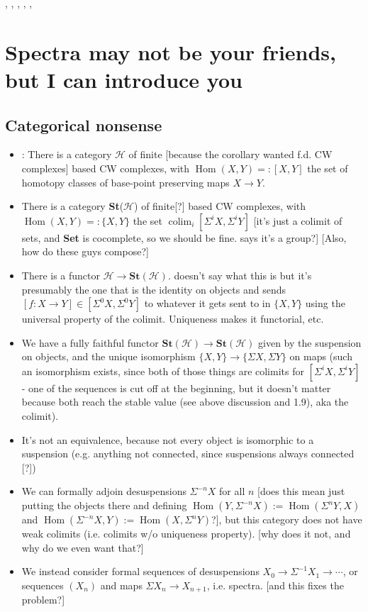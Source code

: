 \documentclass{MetricNotes2023}
\DeclareMathOperator{\colim}{colim}
\DeclareMathOperator{\Hom}{Hom}
\begin{document}
\autocite{stable_homotopy}, \autocite{cobordism}, 
\autocite{ass}, \autocite{spectra}, \autocite{hatcher}, \autocite{foundations}

\section{Spectra may not be your friends, but I can introduce you}

\subsection{Categorical nonsense}

\begin{itemize}
\item \autocite{ass}: There is a category \(\mathcal{H}\) of finite [because the corollary wanted f.d. CW complexes] based CW  complexes, with \(\Hom(X, Y)=:[X, Y]\) the set of homotopy classes of base-point preserving maps \(X\to Y\).
\item There is a category \textbf{St}(\(\mathcal{H}\)) of finite[?] based CW complexes, with \(\Hom(X, Y)=:\{X, Y\}\) the  set \(\colim_i [\Sigma^iX, \Sigma^iY]\) [it's just a colimit of sets, and \textbf{Set} is cocomplete, so we should be fine. \autocite{ass} says it's a group?] [Also, how do these guys compose?]
\item There is a functor \(\mathcal{H}\to \textbf{St}(\mathcal{H})\). \autocite{ass} doesn't say what this is but it's presumably the one that is the identity on objects and sends \([f : X \to Y]\in [\Sigma^0X, \Sigma^0Y]\) to whatever it gets sent to in \(\{X, Y\}\) using the universal property of the colimit. Uniqueness makes it functorial, etc.
\item We have a fully faithful functor \(\textbf{St}(\mathcal{H})\to \textbf{St}(\mathcal{H})\) given by the suspension on objects, and the unique isomorphism \(\{X, Y\}\to\{\Sigma X, \Sigma Y\}\) on maps (such an isomorphism exists, since both of those things are colimits for \([\Sigma^i X, \Sigma^i Y]\) - one of the sequences is cut off at the beginning, but it doesn't matter because both reach the stable value (see above discussion and \autocite{ass} 1.9), aka the colimit). 
\item It's not an equivalence, because not every object is isomorphic to a suspension (e.g. anything not connected, since suspensions always connected [?])
\item We can formally adjoin desuspensions \(\Sigma^{-n}X\) for all \(n\) [does this mean just putting the objects there and defining \(\Hom(Y, \Sigma^{-n}X):=\Hom(\Sigma^nY, X)\) and \(\Hom(\Sigma^{-n}X, Y):=\Hom(X, \Sigma^n Y)\)?], but this category does not have weak colimits (i.e. colimits w/o uniqueness property). [why does it not, and why do we even want that?]
\item We instead consider formal sequences of desuspensions \(X_0 \to \Sigma^{-1}X_1 \to \cdots\), or sequences \((X_n)\) and maps \(\Sigma X_n \to X_{n+1}\), i.e. spectra. [and this fixes the problem?]
\end{itemize}
\end{document}
